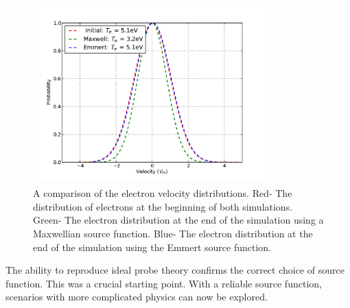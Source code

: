 \begin{figure}[H]
	\centering
	\includegraphics[height=7cm,width=0.8\textwidth]{distributions.pdf}

	\caption{A comparison of the electron velocity distributions. Red- The distribution of electrons at the beginning of both simulations. Green- The electron distribution at the end of the simulation using a Maxwellian source function. Blue- The electron distribution at the end of the simulation using the Emmert source function.}
	\label{fig:EmVsMax}
\end{figure}

The ability to reproduce ideal probe theory confirms the correct choice of source function. This was a crucial starting point. With a reliable source function, scenarios with more complicated physics can now be explored.  


